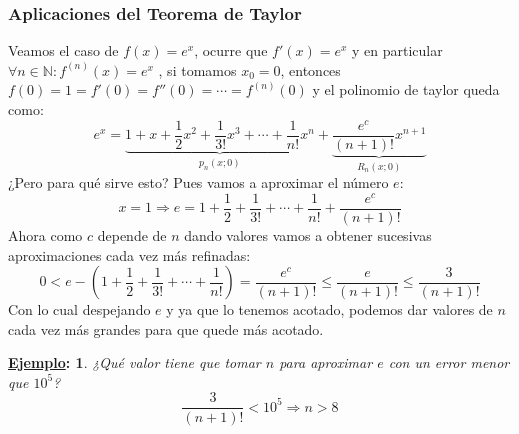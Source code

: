 \documentclass[10pt,a4paper,openright]{book}
\theoremstyle{break}
\newtheorem*{ej}{\underline{Ejemplo}:}
\begin{document}
\subsubsection{Aplicaciones del Teorema de Taylor}
Veamos el caso de $f(x)=e^x$, ocurre que $f'(x)=e^x$ y en particular $\forall n\in \mathbb N : f^{(n)}(x)=e^x$ , si tomamos $x_0=0$, entonces $f(0)=1=f'(0)=f''(0)=\cdots = f^{(n)}(0)$ y el polinomio de taylor queda como:
$$e^x=\underbrace{1+x+\frac{1}{2}x^2+\frac{1}{3!}x^3+\cdots + \frac{1}{n!}x^n}_{p_n(x;0)}+\underbrace{\frac{e^c}{(n+1)!}x^{n+1}}_{R_n(x;0)}$$
¿Pero para qué sirve esto? Pues vamos a aproximar el número $e$:
$$x=1\Rightarrow e=1+\frac{1}{2}+\frac{1}{3!}+\cdots + \frac{1}{n!}+\frac{e^c}{(n+1)!}$$
Ahora como $c$ depende de $n$ dando valores vamos a obtener sucesivas aproximaciones cada vez más refinadas:
$$0< e-(1+\frac{1}{2}+\frac{1}{3!}+\cdots + \frac{1}{n!})=\frac{e^c}{(n+1)!}\leq \frac{e}{(n+1)!}\leq \frac{3}{(n+1)!}$$
Con lo cual despejando $e$ y ya que lo tenemos acotado, podemos dar valores de $n$ cada vez más grandes para que quede más acotado.

\begin{ej}
¿Qué valor tiene que tomar $n$ para aproximar $e$ con un error menor que $10^5$?
$$\frac{3}{(n+1)!}<10^5\Rightarrow n>8$$
\end{ej}
\end{document}
